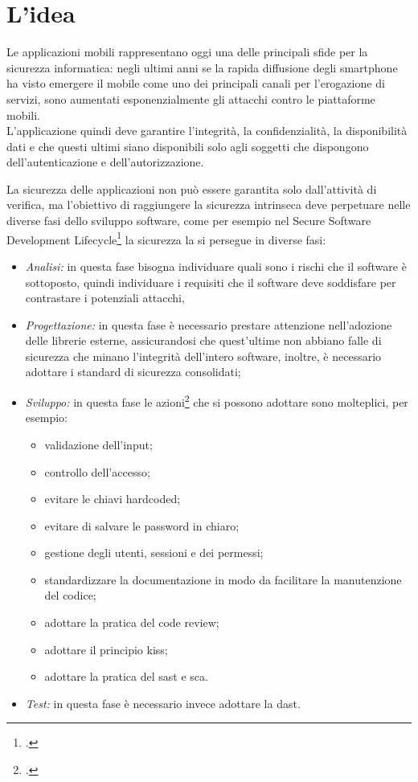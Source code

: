\section{L'idea}\label{sec:l'idea}

Le applicazioni mobili rappresentano oggi una delle principali sfide per la sicurezza informatica: negli ultimi anni se la rapida diffusione degli smartphone ha visto emergere il mobile come uno dei principali canali per l'erogazione di servizi, sono aumentati esponenzialmente gli attacchi contro le piattaforme mobili.\\
L'applicazione quindi deve garantire l'integrità, la confidenzialità, la disponibilità dati e che questi ultimi siano disponibili solo agli soggetti che dispongono dell'autenticazione e dell'autorizzazione.

La sicurezza delle applicazioni non può essere garantita solo dall'attività di verifica, ma l'obiettivo di raggiungere la sicurezza intrinseca deve perpetuare nelle diverse fasi dello sviluppo software, come per esempio nel Secure Software Development Lifecycle\footcite{site:ssdl} la sicurezza la si persegue in diverse fasi:
\begin{itemize}
    \item \textit{Analisi:} in questa fase bisogna individuare quali sono i rischi che il software è sottoposto, quindi individuare i requisiti che il software deve soddisfare per contrastare i potenziali attacchi,
    \item \textit{Progettazione:} in questa fase è necessario prestare attenzione nell'adozione delle librerie esterne, assicurandosi che quest'ultime non abbiano falle di sicurezza che minano l'integrità dell'intero software, inoltre, è necessario adottare i standard di sicurezza consolidati;
    \item \textit{Sviluppo:} in questa fase le azioni\footcite{site:security-best-practice} che si possono adottare sono molteplici, per esempio:
    \begin{itemize}
        \item validazione dell'input;
        \item controllo dell'accesso;
        \item evitare le chiavi hardcoded;
        \item evitare di salvare le password in chiaro;
        \item gestione degli utenti, sessioni e dei permessi;
        \item standardizzare la documentazione in modo da facilitare la manutenzione del codice;
        \item adottare la pratica del code review;
        \item adottare il principio \gls{kiss};
        \item adottare la pratica del \gls{sast} e \gls{sca}.
    \end{itemize}
    \item \textit{Test:} in questa fase è necessario invece adottare la \gls{dast}.
\end{itemize}


